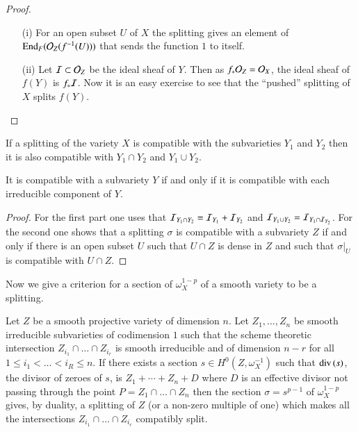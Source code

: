 \begin{proof}
\begin{itemize}
\item[(i)] For an open subset $U$ of $X$ the splitting gives an
  element of $\operatorname{End}_{F}(\mathcal{O}_{Z}(f^{-1}(U)))$ that sends the function $1$
to itself.

\item[(ii)] Let $\mathcal{I}\subset \mathcal{O}_{Z}$ be the ideal sheaf of $Y$. Then as
  $f_{\ast}\mathcal{O}_{Z}=\mathcal{O}_{X}$, the ideal sheaf of $f(Y)$ is
  $f_{\ast}\mathcal{I}$. Now it is an easy exercise to see that the ``pushed''
  splitting of $X$ splits $f(Y)$.
\end{itemize}
\end{proof}

\begin{lemma}\label{lem-A.1.6}
If a splitting of the variety $X$ is compatible with the subvarieties
$Y_{1}$ and $Y_{2}$ then it is also compatible with $Y_{1}\cap Y_{2}$
and $Y_{1}\cup Y_{2}$.

It is compatible with a subvariety $Y$ if and only if it is compatible
with each irreducible component of $Y$.
\end{lemma}

\begin{proof}
For the first part one uses that $\mathcal{I}_{Y_{1}\cap
  Y_{2}}=\mathcal{I}_{Y_{1}}+\mathcal{I}_{Y_{2}}$ and $\mathcal{I}_{Y_{1}\cup
  Y_{2}}=\mathcal{I}_{Y_{1}\cap \mathcal{I}_{Y_{2}}}$. For the second one shows that a
splitting $\sigma$ is compatible with a subvariety $Z$ if and only if
there is an open subset $U$ such that $U\cap Z$ is dense in $Z$ and
such that $\sigma|_{U}$ is compatible with $U\cap Z$.
\end{proof}

Now we give a criterion for a section of $\omega^{1-p}_{X}$ of a
smooth variety to be a splitting.

\begin{proposition}\label{prop-A.1.7}
Let $Z$ be a smooth projective variety of dimension $n$. Let
$Z_{1},\ldots,Z_{n}$ be smooth irreducible subvarieties of codimension
$1$ such that the scheme theoretic intersection
$Z_{i_{1}}\cap\ldots\cap Z_{i_{r}}$ is smooth irreducible and of
dimension $n-r$ for all $1\leq i_{1}<\ldots<i_{R}\leq n$. If there
exists a section $s\in H^{0}(Z,\omega^{-1}_{X})$ such that ${\rm
  div}\,(s)$, the divisor of zeroes of $s$, is $Z_{1}+\cdots+Z_{n}+D$
where $D$ is an effective divisor not passing through the point
$P=Z_{1}\cap\ldots\cap Z_{n}$ then the section $\sigma=s^{p-1}$ of
$\omega^{1-p}_{X}$ gives, by duality, a splitting of $Z$ (or a
non-zero multiple of one) which makes all the intersections
$Z_{i_{1}}\cap\ldots\cap Z_{i_{r}}$ compatibly split.
\end{proposition}


